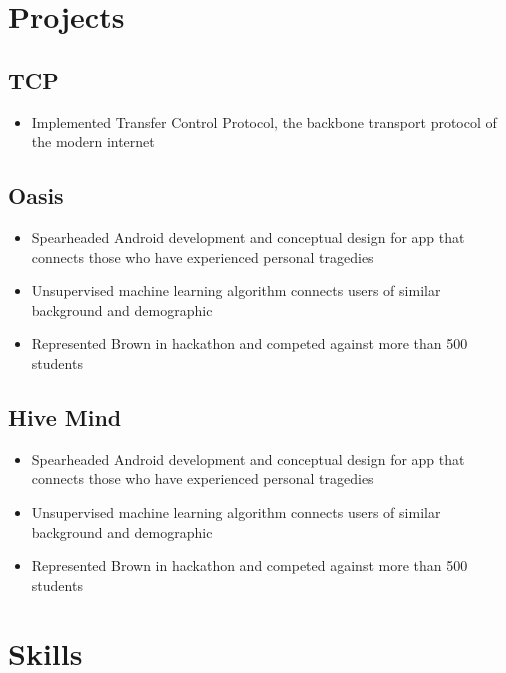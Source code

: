 \documentclass[10pt]{article}
\begin{document}
\section{Projects}

\subsection{TCP}
\begin{itemize}
	\item Implemented Transfer Control Protocol, the backbone transport protocol of the modern internet 
\end{itemize}

\subsection{Oasis}
\begin{itemize}
	\item Spearheaded Android development and conceptual design for app that connects those who have
experienced personal tragedies
	\item Unsupervised machine learning algorithm connects users of similar background and demographic
	\item Represented Brown in hackathon and competed against more than 500 students
\end{itemize}
\subsection{Hive Mind}
\begin{itemize}
	\item Spearheaded Android development and conceptual design for app that connects those who have
experienced personal tragedies
	\item Unsupervised machine learning algorithm connects users of similar background and demographic
	\item Represented Brown in hackathon and competed against more than 500 students
\end{itemize}



\section{Skills}
\end{document}
